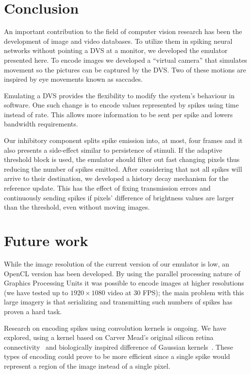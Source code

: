 \documentclass[conference]{IEEEtran}
\begin{document}
\section{Conclusion}
\label{sec:conclusions}
An important contribution to the field of computer vision research has been the development of image and video databases. To utilize them in spiking neural networks without pointing a DVS at a monitor, we developed the emulator presented here. To encode images we developed a ``virtual camera'' that simulates movement so the pictures can be captured by the DVS. Two of these motions are inspired by eye movements known as saccades.

Emulating a DVS provides the flexibility to modify the system's behaviour in software. One such change is to encode values represented by spikes using time instead of rate. This allows more information to be sent per spike and lowers bandwidth requirements. 

Our inhibitory component splits spike emission into, at most, four frames and it also presents a side-effect similar to persistence of stimuli. If the adaptive threshold block is used, the emulator should filter out fast changing pixels thus reducing the number of spikes emitted. After considering that not all spikes will arrive to their destination, we developed a history decay mechanism for the reference update. This has the effect of fixing transmission errors and continuously sending spikes if pixels' difference of brightness values are larger than the threshold, even without moving images.

\section{Future work}
\label{sec:future-work}
While the image resolution of the current version of our emulator is low, an OpenCL version has been developed. By using the parallel processing nature of Graphics Processing Units it was possible to encode images at higher resolutions (we have tested up to $1920\times1080$ video at 30 FPS); the main problem with this large imagery is that serializing and transmitting such numbers of spikes has proven a hard task.

Research on encoding spikes using convolution kernels is ongoing. We have explored, using a kernel based on Carver Mead's original silicon retina connectivity~\cite{Mead1989} and biologically inspired difference of Gaussian kernels~\cite{basab}. These types of encoding could prove to be more efficient since a single spike would represent a region of the image instead of a single pixel.
\end{document}

